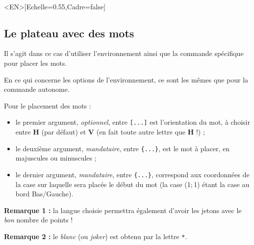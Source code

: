 \documentclass{article}
\newcommand\Cle[1]{{\bfseries\sffamily\textlangle #1\textrangle}}
\begin{document}
\begin{PresentationCode}{}
\PlateauScrabble[Labels=false,Echelle=0.55]\\     %
\PlateauScrabble<EN>[Echelle=0.55,Cadre=false]    %
\end{PresentationCode}

\newpage

\subsection{Le plateau avec des mots}

Il s'agit dans ce cas d'utiliser l'\textsf{environnement} ainsi que la \textsf{commande} spécifique pour placer les mots.

\smallskip

En ce qui concerne les options de l'\textsf{environnement}, ce sont les mêmes que pour la \textsf{commande} autonome.

\smallskip

Pour le placement des mots :

\begin{itemize}
	\item le premier argument, \textit{optionnel}, entre \texttt{[...]} est l'orientation du mot, à choisir entre \Cle{H} (par défaut) et \Cle{V} (en fait toute autre lettre que \Cle{H} !) ;
	\item le deuxième argument, \textit{mandataire}, entre \texttt{\{...\}}, est le mot à placer, en majuscules ou minuscules ;
	\item le dernier argument, \textit{mandataire}, entre \texttt{\{...\}}, correspond aux coordonnées de la case sur laquelle sera placée le début du mot (la case (1;\,1) étant la case au bord Bas/Gauche).
\end{itemize}

\textbf{Remarque 1 :} la langue choisie permettra également d'avoir les jetons avec le \textit{bon} nombre de points !

\smallskip

\textbf{Remarque 2 :} le \textit{blanc} (ou \textit{joker}) est obtenu par la lettre \texttt{*}.

\begin{PresentationCode}{}
\begin{EnvScrabbleFR}[Echelle=0.75,Labels=false,Aide]
\end{EnvScrabbleFR}
\end{PresentationCode}
\end{document}
